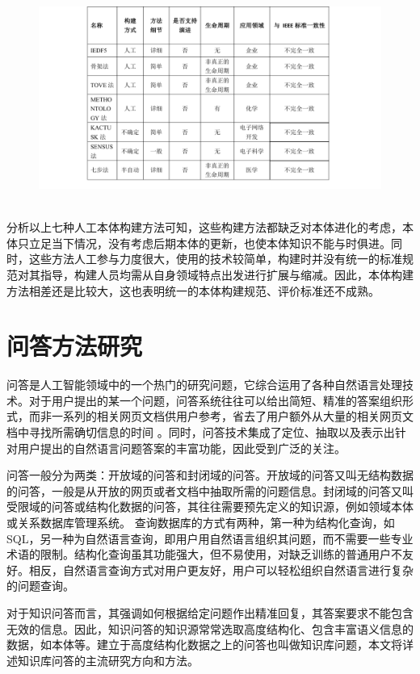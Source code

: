 \begin{figure}[!htb]
	\centering\includegraphics[height=7cm]{resource/onto_method_compare}
	\label{fig:onto_method_compare}
\end{figure}

分析以上七种人工本体构建方法可知，这些构建方法都缺乏对本体进化的考虑，本体只立足当下情况，没有考虑后期本体的更新，也使本体知识不能与时俱进。同时，这些方法人工参与力度很大，使用的技术较简单，构建时并没有统一的标准规范对其指导，构建人员均需从自身领域特点出发进行扩展与缩减。因此，本体构建方法相差还是比较大，这也表明统一的本体构建规范、评价标准还不成熟。

\section{问答方法研究}
问答是人工智能领域中的一个热门的研究问题，它综合运用了各种自然语言处理技术。对于用户提出的某一个问题，问答系统往往可以给出简短、精准的答案组织形式，而非一系列的相关网页文档供用户参考，省去了用户额外从大量的相关网页文档中寻找所需确切信息的时间\cite{Lu} \cite{Bertola}。同时，问答技术集成了定位、抽取以及表示出针对用户提出的自然语言问题答案的丰富功能，因此受到广泛的关注\cite{Abacha}\cite{Pavli}。

问答一般分为两类：开放域的问答和封闭域的问答。开放域的问答又叫无结构数据的问答，一般是从开放的网页或者文档中抽取所需的问题信息。封闭域的问答又叫受限域的问答或结构化数据的问答，其往往需要预先定义的知识源，例如领域本体或关系数据库管理系统\cite{Dalmas}\cite{Dragoni}。 查询数据库的方式有两种，第一种为结构化查询，如SQL，另一种为自然语言查询，即用户用自然语言组织其问题，而不需要一些专业术语的限制\cite{Jagadish}。结构化查询虽其功能强大，但不易使用，对缺乏训练的普通用户不友好。相反，自然语言查询方式对用户更友好，用户可以轻松组织自然语言进行复杂的问题查询。

对于知识问答而言，其强调如何根据给定问题作出精准回复，其答案要求不能包含无效的信息。因此，知识问答的知识源常常选取高度结构化、包含丰富语义信息的数据，如本体等。建立于高度结构化数据之上的问答也叫做知识库问题，本文将详述知识库问答的主流研究方向和方法。

